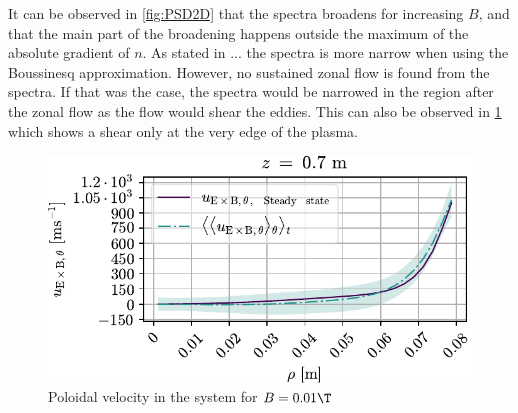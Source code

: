 %
It can be observed in \cref{fig:PSD2D} that the spectra broadens for increasing $B$, and that the main part of the broadening happens outside the maximum of the absolute gradient of $n$.
As stated in ...
the spectra is more narrow when using the Boussinesq approximation.
However, no sustained zonal flow is found from the spectra.
If that was the case, the spectra would be narrowed in the region after the zonal flow as the flow would shear the eddies.
This can also be observed in \cref{fig:zonalFlow0008} which shows a shear only at the very edge of the plasma.
%
\begin{figure}[htb]
    \centering
    \includegraphics{fig/results/poloidalFlow/poloidalFlow01}
    \caption{Poloidal velocity in the system for $B=0.01\T$}
    \label{fig:zonalFlow0008}
\end{figure}
%
